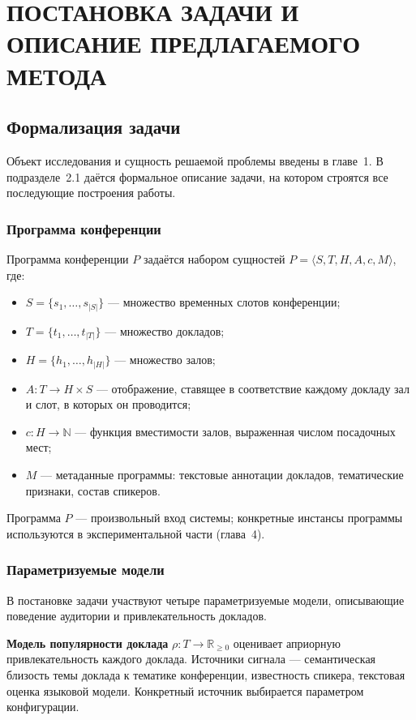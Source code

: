 \chapter{ПОСТАНОВКА ЗАДАЧИ И ОПИСАНИЕ ПРЕДЛАГАЕМОГО МЕТОДА}
\label{ch:method}


\section{Формализация задачи}

Объект исследования и сущность решаемой проблемы введены в главе~1. В подразделе~2.1 даётся формальное описание задачи, на котором строятся все последующие построения работы.


\subsection{Программа конференции}

Программа конференции $P$ задаётся набором сущностей $P = \langle S, T, H, A, c, M \rangle$, где:

\begin{itemize}
\item $S = \{s_1, \dots, s_{|S|}\}$ --- множество временных слотов конференции;
\item $T = \{t_1, \dots, t_{|T|}\}$ --- множество докладов;
\item $H = \{h_1, \dots, h_{|H|}\}$ --- множество залов;
\item $A: T \to H \times S$ --- отображение, ставящее в соответствие каждому докладу зал и слот, в которых он проводится;
\item $c: H \to \mathbb{N}$ --- функция вместимости залов, выраженная числом посадочных мест;
\item $M$ --- метаданные программы: текстовые аннотации докладов, тематические признаки, состав спикеров.
\end{itemize}

Программа $P$ --- произвольный вход системы; конкретные инстансы программы используются в экспериментальной части (глава~4).


\subsection{Параметризуемые модели}

В постановке задачи участвуют четыре параметризуемые модели, описывающие поведение аудитории и привлекательность докладов.

\textbf{Модель популярности доклада} $\rho: T \to \mathbb{R}_{\geq 0}$ оценивает априорную привлекательность каждого доклада. Источники сигнала --- семантическая близость темы доклада к тематике конференции, известность спикера, текстовая оценка языковой модели. Конкретный источник выбирается параметром конфигурации.


